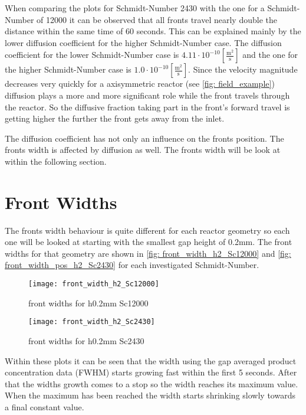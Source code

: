 \documentclass[../thesis.tex]{subfiles}
\begin{document}
When comparing the plots for Schmidt-Number 2430 with the one for a Schmidt-Number of 12000 it can be observed that all fronts travel nearly double the distance within the same time of 60 seconds. This can be explained mainly by the lower diffusion coefficient for the higher Schmidt-Number case. The diffusion coefficient for the lower Schmidt-Number case is $4 \text{.}11 \cdot 10^{-10} \left[ \frac{\mathrm{m^2}}{\mathrm{s}} \right]$ and the one for the higher Schmidt-Number case is $1\text{.}0 \cdot 10^{-10} \left[ \frac{\mathrm{m^2}}{\mathrm{s}} \right]$. Since the velocity magnitude decreases very quickly for a axisymmetric reactor (see \autoref{fig: field_example}) diffusion plays a more and more significant role while the front travels through the reactor. So the diffusive fraction taking part in the front's forward travel is getting higher the further the front gets away from the inlet. 

The diffusion coefficient has not only an influence on the fronts position. The fronts width is affected by diffusion as well. The fronts width will be look at within the following section.

\section{Front Widths}

The fronts width behaviour is quite different for each reactor geometry so each one will be looked at starting with the smallest gap height of 0.2mm. The front widths for that geometry are shown in \autoref{fig: front_width_h2_Sc12000} and \autoref{fig: front_width_pos_h2_Sc2430} for each investigated Schmidt-Number.

\begin{figure}[htbp]
	\centering
	\texttt{[image: front\_width\_h2\_Sc12000]}
	\caption{front widths for h0.2mm Sc12000\label{fig: front_width_h2_Sc12000}}\bigskip
	\texttt{[image: front\_width\_h2\_Sc2430]}
	\caption{front widths for h0.2mm Sc2430\label{fig: front_width_pos_h2_Sc2430}}
\end{figure}

Within these plots it can be seen that the width using the gap averaged product concentration data (FWHM) starts growing fast within the first 5 seconds. After that the widths growth comes to a stop so the width reaches its maximum value. When the maximum has been reached the width starts shrinking slowly towards a final constant value.
\end{document}
